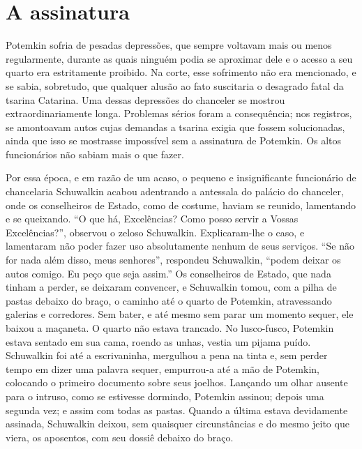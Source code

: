 \section{A assinatura }

Potemkin sofria de pesadas depressões, que sempre voltavam mais ou menos
regularmente, durante as quais ninguém podia se aproximar dele e o
acesso a seu quarto era estritamente proibido. Na corte, esse sofrimento
não era mencionado, e se sabia, sobretudo, que qualquer alusão ao fato
suscitaria o desagrado fatal da tsarina Catarina. Uma dessas depressões
do chanceler se mostrou extraordinariamente longa. Problemas sérios
foram a consequência; nos registros, se amontoavam autos cujas demandas
a tsarina exigia que fossem solucionadas, ainda que isso se mostrasse
impossível sem a assinatura de Potemkin. Os altos funcionários não
sabiam mais o que fazer.

Por essa época, e em razão de um acaso, o pequeno e insignificante
funcionário de chancelaria Schuwalkin acabou adentrando a antessala do
palácio do chanceler, onde os conselheiros de Estado, como de costume,
haviam se reunido, lamentando e se queixando. ``O que há, Excelências?
Como posso servir a Vossas Excelências?'', observou o zeloso Schuwalkin.
Explicaram-lhe o caso, e lamentaram não poder fazer uso absolutamente
nenhum de seus serviços. ``Se não for nada além disso, meus senhores'',
respondeu Schuwalkin, ``podem deixar os autos comigo. Eu peço que seja
assim.'' Os conselheiros de Estado, que nada tinham a perder, se
deixaram convencer, e Schuwalkin tomou, com a pilha de pastas debaixo do
braço, o caminho até o quarto de Potemkin, atravessando galerias e
corredores. Sem bater, e até mesmo sem parar um momento sequer, ele
baixou a maçaneta. O quarto não estava trancado. No lusco-fusco,
Potemkin estava sentado em sua cama, roendo as unhas, vestia um pijama
puído. Schuwalkin foi até a escrivaninha, mergulhou a pena na tinta e,
sem perder tempo em dizer uma palavra sequer, empurrou-a até a mão de
Potemkin, colocando o primeiro documento sobre seus joelhos. Lançando um
olhar ausente para o intruso, como se estivesse dormindo, Potemkin
assinou; depois uma segunda vez; e assim com todas as pastas. Quando a
última estava devidamente assinada, Schuwalkin deixou, sem quaisquer
circunstâncias e do mesmo jeito que viera, os aposentos, com seu dossiê
debaixo do braço.


